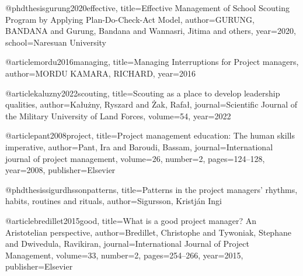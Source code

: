 @phdthesis{gurung2020effective,
  title={Effective Management of School Scouting Program by Applying Plan-Do-Check-Act Model},
  author={GURUNG, BANDANA and Gurung, Bandana and Wannasri, Jitima and others},
  year={2020},
  school={Naresuan University}
}

@article{mordu2016managing,
  title={Managing Interruptions for Project managers},
  author={MORDU KAMARA, RICHARD},
  year={2016}
}

@article{kaluzny2022scouting,
  title={Scouting as a place to develop leadership qualities},
  author={Ka{\l}u{\.z}ny, Ryszard and {\.Z}ak, Rafa{\l}},
  journal={Scientific Journal of the Military University of Land Forces},
  volume={54},
  year={2022}
}

@article{pant2008project,
  title={Project management education: The human skills imperative},
  author={Pant, Ira and Baroudi, Bassam},
  journal={International journal of project management},
  volume={26},
  number={2},
  pages={124--128},
  year={2008},
  publisher={Elsevier}
}

@phdthesis{sigurdhssonpatterns,
  title={Patterns in the project managers’ rhythms, habits, routines and rituals},
  author={Sigur{\dh}sson, Kristj{\'a}n Ingi}
}

@article{bredillet2015good,
  title={What is a good project manager? An Aristotelian perspective},
  author={Bredillet, Christophe and Tywoniak, Stephane and Dwivedula, Ravikiran},
  journal={International Journal of Project Management},
  volume={33},
  number={2},
  pages={254--266},
  year={2015},
  publisher={Elsevier}
}
